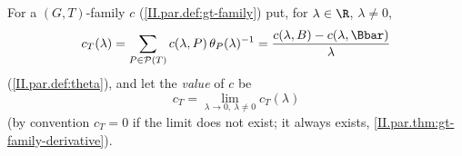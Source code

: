 For a $(G,T)$-family $c$ (\cref{II.par.def:gt-family}) put, for $\lambda\in\R$, $\lambda\neq0$,
\[
  c_T(\lambda)=\sum_{P\in\mathcal P(T)}c(\lambda,P)\,\theta_P(\lambda)^{-1}=\frac{c(\lambda,B)-c(\lambda,\Bbar)}{\lambda}
\]
(\cref{II.par.def:theta}), and let the \emph{value} of $c$ be
\[
  c_T=\lim_{\lambda\to0,\ \lambda\neq0}c_T(\lambda)
\]
(by convention $c_T=0$ if the limit does not exist; it always exists, \cref{II.par.thm:gt-family-derivative}).
